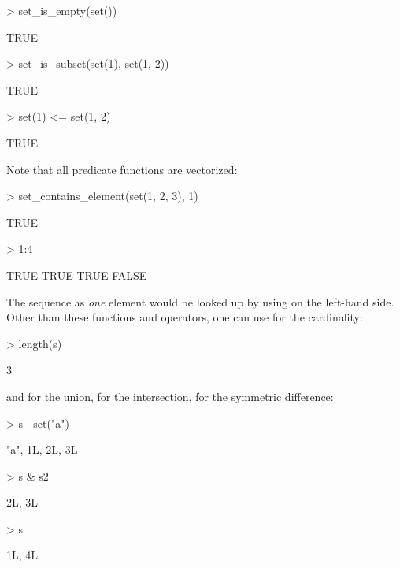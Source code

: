 \documentclass[article]{jss}
\newcommand{\codefun}[1]{\code{#1()}}
\begin{document}
\begin{Schunk}
\begin{Sinput}
> set_is_empty(set())
\end{Sinput}
\begin{Soutput}
[1] TRUE
\end{Soutput}
\begin{Sinput}
> set_is_subset(set(1), set(1, 2))
\end{Sinput}
\begin{Soutput}
[1] TRUE
\end{Soutput}
\begin{Sinput}
> set(1) <= set(1, 2)
\end{Sinput}
\begin{Soutput}
[1] TRUE
\end{Soutput}
\end{Schunk}
Note that all predicate functions are vectorized:
\begin{Schunk}
\begin{Sinput}
> set_contains_element(set(1, 2, 3), 1)
\end{Sinput}
\begin{Soutput}
[1] TRUE
\end{Soutput}
\begin{Sinput}
> 1:4 %
\end{Sinput}
\begin{Soutput}
[1]  TRUE  TRUE  TRUE FALSE
\end{Soutput}
\end{Schunk}
The sequence  as \emph{one} element would be looked up by
using  on the left-hand side.
Other than these functions and operators, one can use
\codefun{length} for the cardinality:
\begin{Schunk}
\begin{Sinput}
> length(s)
\end{Sinput}
\begin{Soutput}
[1] 3
\end{Soutput}
\end{Schunk}
\codefun{c} and \code{|} for the union, \code{\&} for the intersection,
 for the symmetric difference:
\begin{Schunk}
\begin{Sinput}
> s | set("a")
\end{Sinput}
\begin{Soutput}
{"a", 1L, 2L, 3L}
\end{Soutput}
\begin{Sinput}
> s & s2
\end{Sinput}
\begin{Soutput}
{2L, 3L}
\end{Soutput}
\begin{Sinput}
> s %
\end{Sinput}
\begin{Soutput}
{1L, 4L}
\end{Soutput}
\end{Schunk}
\end{document}
